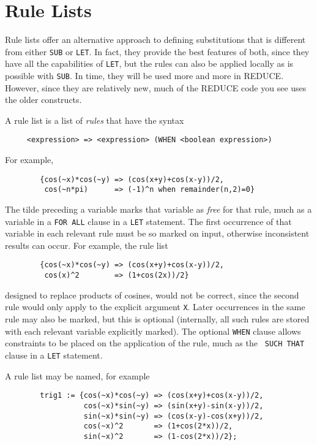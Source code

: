 \documentclass[11pt,letterpaper]{book}
\makeatletter
\newcommand{\REDUCE}{REDUCE}
\newcommand{\underscore}{\_}
\newcommand{\ttindex}[1]{{\renewcommand{\_}{\protect\underscore}%
                          \index{#1@{\tt #1}}}}
\makeatother
\begin{document}
\section{Rule Lists} 

Rule lists offer an alternative approach to defining substitutions that is
different from either {\tt SUB} or {\tt LET}.  In fact, they provide the
best features of both, since they have all the capabilities of {\tt LET},
but the rules can also be applied locally as is possible with {\tt SUB}.
In time, they will be used more and more in {\REDUCE}.  However, since they
are relatively new, much of the {\REDUCE} code you see uses the older
constructs.

A rule list is a list of {\em rules\/} that have the syntax
{\small\begin{verbatim}
     <expression> => <expression> (WHEN <boolean expression>)
\end{verbatim}}
For example,
{\small\begin{verbatim}
        {cos(~x)*cos(~y) => (cos(x+y)+cos(x-y))/2,
         cos(~n*pi)      => (-1)^n when remainder(n,2)=0}
\end{verbatim}}

The tilde preceding a variable marks that variable as {\em free\/} for that
rule, much as a variable in a {\tt FOR ALL} clause in a {\tt LET}
statement.  The first occurrence of that variable in each relevant rule
must be so marked on input, otherwise inconsistent results can occur.
For example, the rule list
{\small\begin{verbatim}
        {cos(~x)*cos(~y) => (cos(x+y)+cos(x-y))/2,
         cos(x)^2        => (1+cos(2x))/2}
\end{verbatim}}
designed to replace products of cosines, would not be correct, since the
second rule would only apply to the explicit argument {\tt X}.  Later
occurrences in the same rule may also be marked, but this is optional
(internally, all such rules are stored with each relevant variable
explicitly marked).  The optional {\tt WHEN}\ttindex{WHEN} clause allows
constraints to be placed on the application of the rule, much as the {\tt
SUCH THAT} clause in a {\tt LET} statement.

A rule list may be named, for example
{\small\begin{verbatim}
        trig1 := {cos(~x)*cos(~y) => (cos(x+y)+cos(x-y))/2,
                  cos(~x)*sin(~y) => (sin(x+y)-sin(x-y))/2,
                  sin(~x)*sin(~y) => (cos(x-y)-cos(x+y))/2,
                  cos(~x)^2       => (1+cos(2*x))/2,
                  sin(~x)^2       => (1-cos(2*x))/2};
\end{verbatim}}
\end{document}

